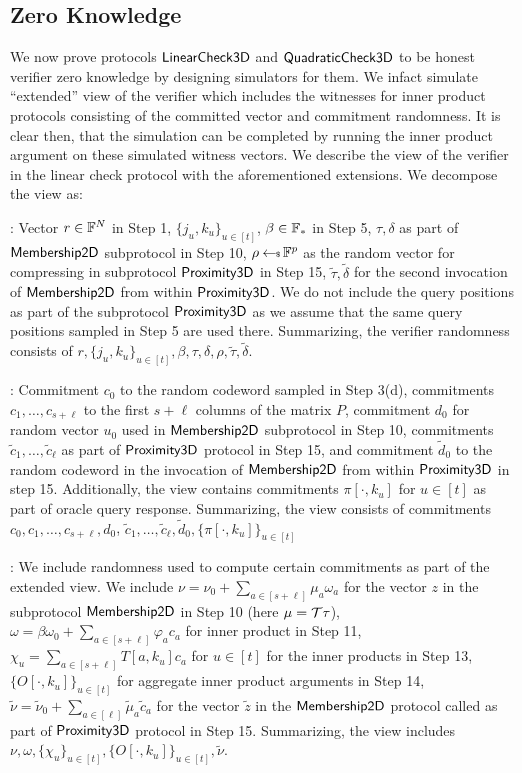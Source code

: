 \subsection{Zero Knowledge}
We now prove protocols $\mathsf{LinearCheck3D}$ and $\mathsf{QuadraticCheck3D}$ to be honest verifier zero knowledge by
designing simulators for them. We infact simulate ``extended'' view of the
verifier which includes
the witnesses for inner product protocols consisting of the committed vector 
and commitment randomness. It is clear then, that the simulation can be
completed by running the inner product argument on these simulated witness
vectors. We describe the view of the verifier in the linear check protocol with
the aforementioned extensions. We decompose the view as:

: Vector $r\in \mathbb{F}^N$ in Step 1,
$\{j_u,k_u\}_{u\in [t]}$, $\beta\in \mathbb{F}_\ast$ in Step 5, $\tau,\delta$ as
part of $\mathsf{Membership2D}$ subprotocol in Step 10, $\rho\hskip2.3pt{\gets\!\!\mbox{\tiny${\$}$\normalsize}}\, \mathbb{F}^p$ as the
random vector for compressing in subprotocol $\mathsf{Proximity3D}$ in Step 15,
$\tilde{\tau},\tilde{\delta}$ for the second invocation of $\mathsf{Membership2D}$ from within
$\mathsf{Proximity3D}$. We
do not include the query positions as part of the subprotocol $\mathsf{Proximity3D}$
as we assume that the same query positions sampled in Step 5 are used there.
Summarizing, the verifier randomness consists of $r,\{j_u,k_u\}_{u\in
[t]},\beta,\tau,\delta,\rho,\tilde{\tau},\tilde{\delta}$.

: Commitment $c_0$ to the random codeword sampled in Step
3(d), commitments $c_1,\ldots,c_{s+\ell}$ to the first $s+\ell$ columns of the
matrix $P$, commitment $d_0$ for random vector $u_0$ used in $\mathsf{Membership2D}$
subprotocol in Step 10, commitments $\tilde{c}_1,\ldots,\tilde{c}_{\ell}$ as
part of $\mathsf{Proximity3D}$ protocol in Step 15, and commitment $\tilde{d}_0$ to
the random codeword in the invocation of $\mathsf{Membership2D}$ from within
$\mathsf{Proximity3D}$ in step 15. Additionally, the view contains commitments
$\pi[\cdot,k_u]$ for $u\in [t]$ as part of oracle query response. Summarizing,
the view consists of commitments $c_0,c_1,\ldots,c_{s+\ell},d_0$, 
$\tilde{c}_1,\ldots,\tilde{c}_{\ell},\tilde{d}_0,\{\pi[\cdot,k_u]\}_{u\in [t]}$

: We include randomness used to compute certain
commitments as part of the extended view. We include $\nu=\nu_0+\sum_{a\in
[s+\ell]}\mu_a\omega_a$ for the vector $z$ in the subprotocol
$\mathsf{Membership2D}$ in Step 10 (here $\mu=\mathcal{T}\tau$),
$\omega=\beta\omega_0+\sum_{a\in [s+\ell]}\varphi_ac_a$ for inner product in
Step 11, $\chi_u=\sum_{a\in [s+\ell]}T[a,k_u]c_a$ for $u\in [t]$ for the inner
products in Step 13, $\{O[\cdot,k_u]\}_{u\in [t]}$ for aggregate inner product
arguments in Step 14, $\tilde{\nu}=\tilde{\nu}_0+\sum_{a\in
[\ell]}\tilde{\mu}_a\tilde{c}_a$ for the vector $\tilde{z}$ in the
$\mathsf{Membership2D}$ protocol called as part of $\mathsf{Proximity3D}$ protocol in Step
15. Summarizing, the view includes $\nu,\omega,\{\chi_u\}_{u\in
[t]},\{O[\cdot,k_u]\}_{u\in [t]},\tilde{\nu}$.

